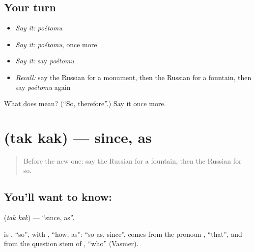 \subsection*{Your turn}
\begin{itemize}
\raggedright
  \item \emph{Say it:} \emph{poétomu}
  \item \emph{Say it:} \emph{poétomu}, once more
  \item \emph{Say it:} say \emph{poétomu}
  \item \emph{Recall:} say the Russian for a monument, then the Russian for a fountain, then say \emph{poétomu} again
\end{itemize}

\begin{tcolorbox}[breakable,colback=teal!4,colframe=teal!35!black,title={Before you move on}]
What does  mean? (\textquotedblleft{}So, therefore\textquotedblright{}.) Say it once more.
\end{tcolorbox}
\section[\texorpdfstring{\ru{так} \ru{как} (tak kak)}{так как (tak kak)}]{  (tak kak) — since, as}

\label{lesson:RU-C154-tak-kak}



\begin{quote}
Before the new one: say the Russian for a fountain, then the Russian for so.
\end{quote}

\subsection*{You'll want to know:  }
\textbf{ } (\emph{tak kak}) — \textquotedblleft{}since, as\textquotedblright{}.

\begin{cousinweb}
\textbf{ } is \emph{}, \textquotedblleft{}so\textquotedblright{}, with \emph{}, \textquotedblleft{}how, as\textquotedblright{}: \textquotedblleft{}so as, since\textquotedblright{}. \emph{} comes from the pronoun \emph{}, \textquotedblleft{}that\textquotedblright{}, and \emph{} from the question stem of \emph{}, \textquotedblleft{}who\textquotedblright{} (Vasmer).
\end{cousinweb}

